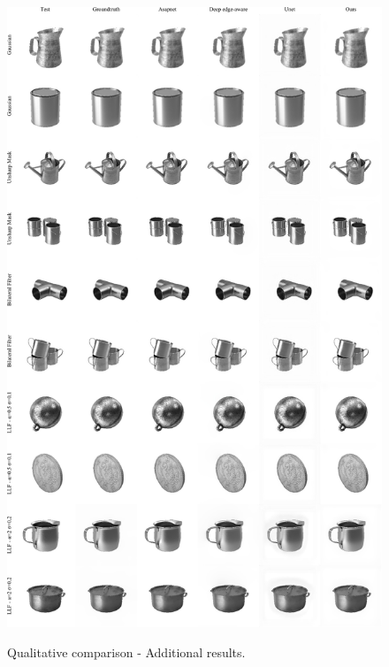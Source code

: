 \begin{figure}[ht]
  \centering
  {\includegraphics[width=0.8\linewidth]{Chapters/appendix-figs/material.pdf}}

   \caption{Qualitative comparison - Additional results.}
   \label{fig:appendix-DR-material}
\end{figure}

